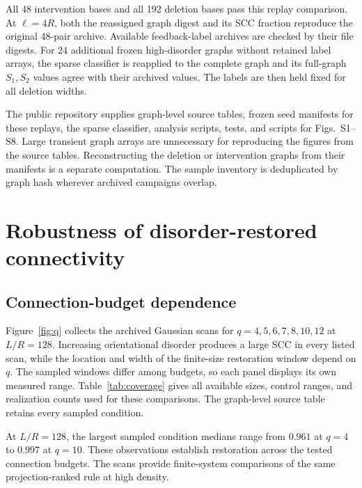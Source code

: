 \documentclass[11pt]{article}
\begin{document}
All 48 intervention bases and all 192 deletion bases pass this replay comparison. At $\ell=4R$, both the reassigned graph digest and its SCC fraction reproduce the original 48-pair archive. Available feedback-label archives are checked by their file digests. For 24 additional frozen high-disorder graphs without retained label arrays, the sparse classifier is reapplied to the complete graph and its full-graph $S_1,S_2$ values agree with their archived values. The labels are then held fixed for all deletion widths.

The public repository supplies graph-level source tables, frozen seed manifests for these replays, the sparse classifier, analysis scripts, tests, and scripts for Figs.~S1--S8. Large transient graph arrays are unnecessary for reproducing the figures from the source tables. Reconstructing the deletion or intervention graphs from their manifests is a separate computation. The sample inventory is deduplicated by graph hash wherever archived campaigns overlap.

\FloatBarrier
\section{Robustness of disorder-restored connectivity}
\subsection{Connection-budget dependence}
Figure~\ref{fig:q} collects the archived Gaussian scans for $q=4,5,6,7,8,10,12$ at $L/R=128$. Increasing orientational disorder produces a large SCC in every listed scan, while the location and width of the finite-size restoration window depend on $q$. The sampled windows differ among budgets, so each panel displays its own measured range. Table~\ref{tab:coverage} gives all available sizes, control ranges, and realization counts used for these comparisons. The graph-level source table retains every sampled condition.

At $L/R=128$, the largest sampled condition medians range from $0.961$ at $q=4$ to $0.997$ at $q=10$. These observations establish restoration across the tested connection budgets. The scans provide finite-system comparisons of the same projection-ranked rule at high density.
\end{document}
